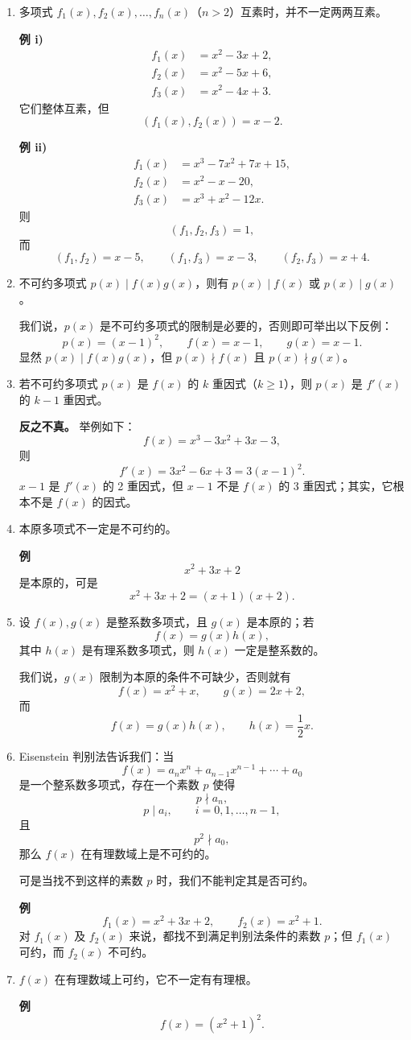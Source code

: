 \begin{enumerate}
\item 多项式 $f_1(x),f_2(x),\ldots,f_n(x)$（$n>2$）互素时，并不一定两两互素。

\textbf{例 i)}
\[
\begin{aligned}
 f_1(x)&=x^2-3x+2,\\
 f_2(x)&=x^2-5x+6,\\
 f_3(x)&=x^2-4x+3.
\end{aligned}
\]
它们整体互素，但
\[
 (f_1(x),f_2(x))=x-2.
\]

\textbf{例 ii)}
\[
\begin{aligned}
 f_1(x)&=x^3-7x^2+7x+15,\\
 f_2(x)&=x^2-x-20,\\
 f_3(x)&=x^3+x^2-12x.
\end{aligned}
\]
则
\[
 (f_1,f_2,f_3)=1,
\]
而
\[
 (f_1,f_2)=x-5,
 \qquad (f_1,f_3)=x-3,
 \qquad (f_2,f_3)=x+4.
\]

\item 不可约多项式 $p(x)\mid f(x)g(x)$，则有 $p(x)\mid f(x)$ 或 $p(x)\mid g(x)$。

我们说，$p(x)$ 是不可约多项式的限制是必要的，否则即可举出以下反例：
\[
 p(x)=(x-1)^2,\qquad f(x)=x-1,\qquad g(x)=x-1.
\]
显然 $p(x)\mid f(x)g(x)$，但 $p(x)\nmid f(x)$ 且 $p(x)\nmid g(x)$。

\item 若不可约多项式 $p(x)$ 是 $f(x)$ 的 $k$ 重因式（$k\ge 1$），则 $p(x)$ 是 $f'(x)$ 的 $k-1$ 重因式。

\textbf{反之不真。} 举例如下：
\[
 f(x)=x^3-3x^2+3x-3,
\]
则
\[
 f'(x)=3x^2-6x+3=3(x-1)^2.
\]
$x-1$ 是 $f'(x)$ 的 2 重因式，但 $x-1$ 不是 $f(x)$ 的 3 重因式；其实，它根本不是 $f(x)$ 的因式。

\item 本原多项式不一定是不可约的。

\textbf{例}
\[
 x^2+3x+2
\]
是本原的，可是
\[
 x^2+3x+2=(x+1)(x+2).
\]

\item 设 $f(x),g(x)$ 是整系数多项式，且 $g(x)$ 是本原的；若
\[
 f(x)=g(x)h(x),
\]
其中 $h(x)$ 是有理系数多项式，则 $h(x)$ 一定是整系数的。

我们说，$g(x)$ 限制为本原的条件不可缺少，否则就有
\[
 f(x)=x^2+x,\qquad g(x)=2x+2,
\]
而
\[
 f(x)=g(x)h(x),\qquad h(x)=\frac12x.
\]

\item Eisenstein 判别法告诉我们：当
\[
 f(x)=a_nx^n+a_{n-1}x^{n-1}+\cdots+a_0
\]
是一个整系数多项式，存在一个素数 $p$ 使得
\[
 p\nmid a_n,
\]
\[
 p\mid a_i,\qquad i=0,1,\ldots,n-1,
\]
且
\[
 p^2\nmid a_0,
\]
那么 $f(x)$ 在有理数域上是不可约的。

可是当找不到这样的素数 $p$ 时，我们不能判定其是否可约。

\textbf{例}
\[
 f_1(x)=x^2+3x+2,
 \qquad
 f_2(x)=x^2+1.
\]
对 $f_1(x)$ 及 $f_2(x)$ 来说，都找不到满足判别法条件的素数 $p$；但 $f_1(x)$ 可约，而 $f_2(x)$ 不可约。

\item $f(x)$ 在有理数域上可约，它不一定有有理根。

\textbf{例}
\[
 f(x)=(x^2+1)^2.
\]
\end{enumerate}


